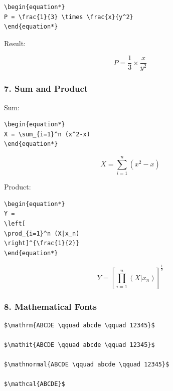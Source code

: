 \documentclass[a4paper,10pt]{article}
\begin{document}
\begin{verbatim}
\begin{equation*}
P = \frac{1}{3} \times \frac{x}{y^2}
\end{equation*}
\end{verbatim}

Result:

\begin{equation*}
P = \frac{1}{3} \times \frac{x}{y^2}
\end{equation*}


\subsubsection{7. Sum and Product}

Sum:

\begin{verbatim}
\begin{equation*}
X = \sum_{i=1}^n (x^2-x)
\end{equation*}
\end{verbatim}

\begin{equation*}
X = \sum_{i=1}^n (x^2-x)
\end{equation*}

Product:

\begin{verbatim}
\begin{equation*}
Y =
\left[
\prod_{i=1}^n (X|x_n)
\right]^{\frac{1}{2}}
\end{equation*}
\end{verbatim}

\begin{equation*}
Y =
\left[
\prod_{i=1}^n (X|x_n)
\right]^{\frac{1}{2}}
\end{equation*}


\subsubsection{8. Mathematical Fonts}

\begin{verbatim}
$\mathrm{ABCDE \qquad abcde \qquad 12345}$

$\mathit{ABCDE \qquad abcde \qquad 12345}$

$\mathnormal{ABCDE \qquad abcde \qquad 12345}$

$\mathcal{ABCDE}$
\end{verbatim}
\end{document}
